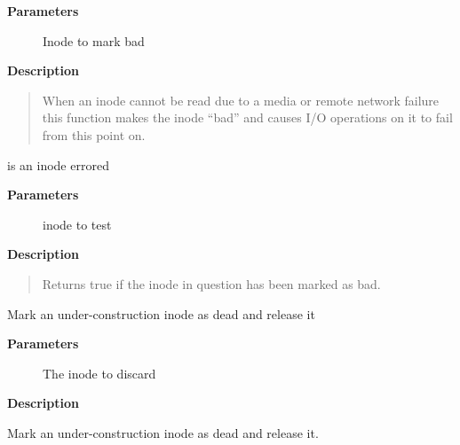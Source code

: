 \documentclass[a4paper,8pt,english]{sphinxmanual}
\begin{document}
\textbf{Parameters}
\begin{description}
\item[{}] \leavevmode
Inode to mark bad

\end{description}

\textbf{Description}
\begin{quote}

When an inode cannot be read due to a media or remote network
failure this function makes the inode ``bad'' and causes I/O operations
on it to fail from this point on.
\end{quote}

\begin{fulllineitems}
\label{filesystems/index:c.is_bad_inode}
is an inode errored

\end{fulllineitems}


\textbf{Parameters}
\begin{description}
\item[{}] \leavevmode
inode to test

\end{description}

\textbf{Description}
\begin{quote}

Returns true if the inode in question has been marked as bad.
\end{quote}

\begin{fulllineitems}
\label{filesystems/index:c.iget_failed}
Mark an under-construction inode as dead and release it

\end{fulllineitems}


\textbf{Parameters}
\begin{description}
\item[{}] \leavevmode
The inode to discard

\end{description}

\textbf{Description}

Mark an under-construction inode as dead and release it.
\end{document}
